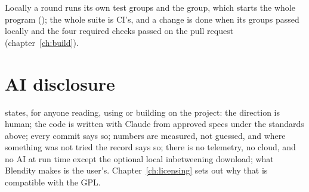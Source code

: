 Locally a round runs its own test groups and the  group, which starts the whole program (); the
whole suite is CI's, and a change is done when its groups passed locally and the four required checks passed on the pull
request (chapter~\ref{ch:build}).

\section{AI disclosure}
 states, for anyone reading, using or building on the project: the direction is human; the
code is written with Claude from approved specs under the standards above; every commit says so; numbers are measured,
not guessed, and where something was not tried the record says so; there is no telemetry, no cloud, and no AI at run
time except the optional local inbetweening download; what Blendity makes is the user's. Chapter~\ref{ch:licensing}
sets out why that is compatible with the GPL.
